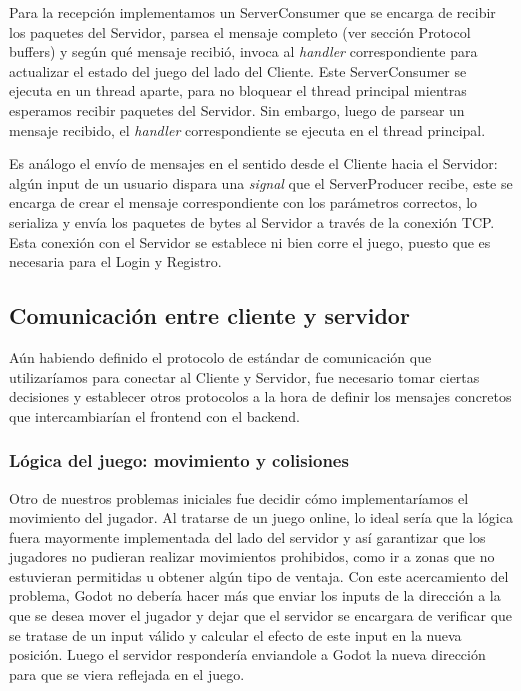 Para la recepción implementamos un ServerConsumer que se encarga de recibir los paquetes 
del Servidor, parsea el mensaje completo (ver sección Protocol buffers) y según qué mensaje recibió, 
invoca al \textit{handler} correspondiente para actualizar el estado del juego del lado del Cliente.
Este ServerConsumer se ejecuta en un thread aparte, para no bloquear el thread principal mientras
esperamos recibir paquetes del Servidor. Sin embargo, luego de parsear un mensaje recibido, el \textit{handler}
correspondiente se ejecuta en el thread principal.

Es análogo el envío de mensajes en el sentido desde el Cliente hacia el Servidor: algún input de un 
usuario dispara una \textit{signal} que el ServerProducer recibe, este se encarga de crear 
el mensaje correspondiente con los parámetros correctos, lo serializa y envía los paquetes de bytes 
al Servidor a través de la conexión TCP.
Esta conexión con el Servidor se establece ni bien corre el juego, puesto que es necesaria para el Login y Registro.

\subsection{Comunicación entre cliente y servidor}
Aún habiendo definido el protocolo de estándar de comunicación que utilizaríamos para conectar al Cliente y Servidor,
fue necesario tomar ciertas decisiones y establecer otros protocolos a la hora de definir los mensajes
concretos que intercambiarían el frontend con el backend.

\subsubsection{Lógica del juego: movimiento y colisiones}
\label{sec:movement-logic}
\noindent Otro de nuestros problemas iniciales fue decidir cómo implementaríamos el movimiento del 
jugador. Al tratarse de un juego online, lo ideal sería que la lógica fuera mayormente implementada del 
lado del servidor y así garantizar que los jugadores no pudieran realizar movimientos prohibidos, como 
ir a zonas que no estuvieran permitidas u obtener algún tipo de ventaja. Con este acercamiento del 
problema, Godot no debería hacer más que enviar los inputs de la dirección a la que se desea mover el 
jugador y dejar que el servidor se encargara de verificar que se tratase de un input válido y calcular 
el efecto de este input en la nueva posición. Luego el servidor respondería enviandole a Godot la nueva
dirección para que se viera reflejada en el juego.

